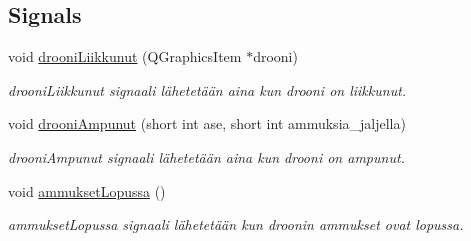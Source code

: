 \subsection*{Signals}
\begin{DoxyCompactItemize}
\item 
void \hyperlink{class_drooni_a3020c56fa8b0d3bfe6c1fff40df4ab2d}{drooni\-Liikkunut} (Q\-Graphics\-Item $\ast$drooni)
\begin{DoxyCompactList}\small\item\em drooni\-Liikkunut signaali lähetetään aina kun drooni on liikkunut. \end{DoxyCompactList}\item 
void \hyperlink{class_drooni_a60161e48737707a81e74982c545b8a5d}{drooni\-Ampunut} (short int ase, short int ammuksia\-\_\-jaljella)
\begin{DoxyCompactList}\small\item\em drooni\-Ampunut signaali lähetetään aina kun drooni on ampunut. \end{DoxyCompactList}\item 
\hypertarget{class_drooni_a7ba9264caa5365a27f51035dd2892860}{void \hyperlink{class_drooni_a7ba9264caa5365a27f51035dd2892860}{ammukset\-Lopussa} ()}\label{class_drooni_a7ba9264caa5365a27f51035dd2892860}

\begin{DoxyCompactList}\small\item\em ammukset\-Lopussa signaali lähetetään kun droonin ammukset ovat lopussa. \end{DoxyCompactList}\end{DoxyCompactItemize}
